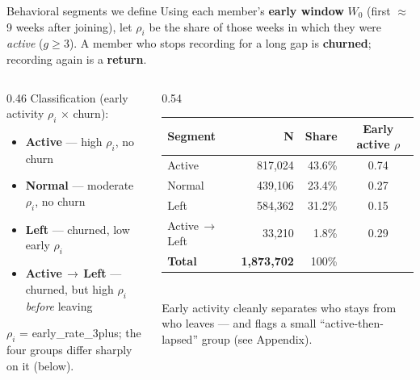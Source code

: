 \documentclass[10pt,aspectratio=169]{beamer}
\begin{document}
\begin{frame}{Behavioral segments we define}
  {\footnotesize Using each member's \textbf{early window} $W_0$ (first $\approx$9 weeks after joining), let $\rho_i$ be the share of those weeks in which they were \emph{active} ($g\!\ge\!3$). A member who stops recording for a long gap is \textbf{churned}; recording again is a \textbf{return}.}
  \vspace*{0.4em}
  \begin{columns}[T]
    \begin{column}{0.46\textwidth}
      \footnotesize
      Classification (early activity $\rho_i$ $\times$ churn):
      \begin{itemize}
        \item \textbf{Active} --- high $\rho_i$, no churn
        \item \textbf{Normal} --- moderate $\rho_i$, no churn
        \item \textbf{Left} --- churned, low early $\rho_i$
        \item \textbf{Active\,$\to$\,Left} --- churned, but high $\rho_i$ \emph{before} leaving
      \end{itemize}
      \vspace*{0.3em}
      {\color{graytx}\scriptsize $\rho_i$ = early\_rate\_3plus; the four groups differ sharply on it (below).}
    \end{column}
    \begin{column}{0.54\textwidth}
      \centering\scriptsize
      \renewcommand{\arraystretch}{1.2}
      \begin{tabular}{@{}l r r c@{}}
        \toprule
        Segment & N & Share & Early active $\rho$\\
        \midrule
        Active            & 817{,}024 & 43.6\% & 0.74\\
        Normal            & 439{,}106 & 23.4\% & 0.27\\
        Left              & 584{,}362 & 31.2\% & 0.15\\
        Active\,$\to$\,Left & 33{,}210 & 1.8\% & 0.29\\
        \midrule
        \textbf{Total}    & \textbf{1{,}873{,}702} & 100\% & \\
        \bottomrule
      \end{tabular}\\[0.5em]
      {\color{ink}\footnotesize Early activity cleanly separates who stays from who leaves --- and flags a small ``active-then-lapsed'' group (see Appendix).}
    \end{column}
  \end{columns}
\end{frame}
\end{document}
